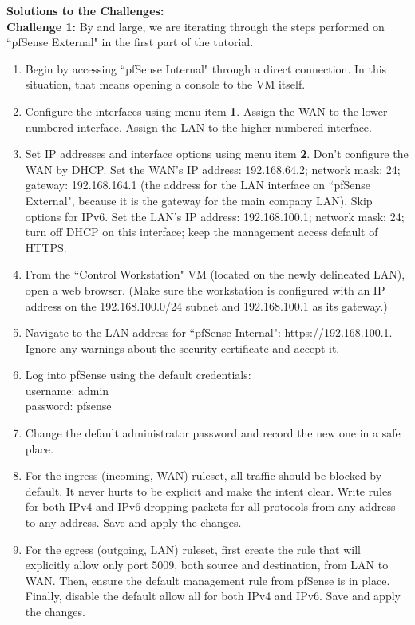 \documentclass[12pt]{extarticle}
\begin{document}
\vspace{8mm}
\noindent
\textbf{Solutions to the Challenges:}\\


\noindent
\textbf{Challenge 1:}
\noindent
By and large, we are iterating through the steps performed on ``pfSense External" in the first part of the tutorial.

\begin{enumerate}
	\item Begin by accessing ``pfSense Internal" through a direct connection. In this situation, that means opening a console to the VM itself. 
	\item Configure the interfaces using menu item \textbf{1}. Assign the WAN to the lower-numbered interface. Assign the LAN to the higher-numbered interface.
	\item Set IP addresses and interface options using menu item \textbf{2}. Don't configure the WAN by DHCP. Set the WAN's IP address: 192.168.64.2; network mask: 24; gateway: 192.168.164.1 (the address for the LAN interface on ``pfSense External", because it is the gateway for the main company LAN). Skip options for IPv6. Set the LAN's IP address: 192.168.100.1; network mask: 24; turn off DHCP on this interface; keep the management access default of HTTPS.
	\item From the ``Control Workstation" VM (located on the newly delineated LAN), open a web browser. (Make sure the workstation is configured with an IP address on the 192.168.100.0/24 subnet and 192.168.100.1 as its gateway.)
	\item Navigate to the LAN address for ``pfSense Internal": https://192.168.100.1. Ignore any warnings about the security certificate and accept it.
	\item Log into pfSense using the default credentials:\\
	username: admin\\
	password: pfsense
	\item Change the default administrator password and record the new one in a safe place.
	\item For the ingress (incoming, WAN) ruleset, all traffic should be blocked by default. It never hurts to be explicit and make the intent clear. Write rules for both IPv4 and IPv6 dropping packets for all protocols from any address to any address. Save and apply the changes.
	\item For the egress (outgoing, LAN) ruleset, first create the rule that will explicitly allow only port 5009, both source and destination, from LAN to WAN. Then, ensure the default management rule from pfSense is in place. Finally, disable the default allow all for both IPv4 and IPv6. Save and apply the changes.
\end{enumerate}
\end{document}
